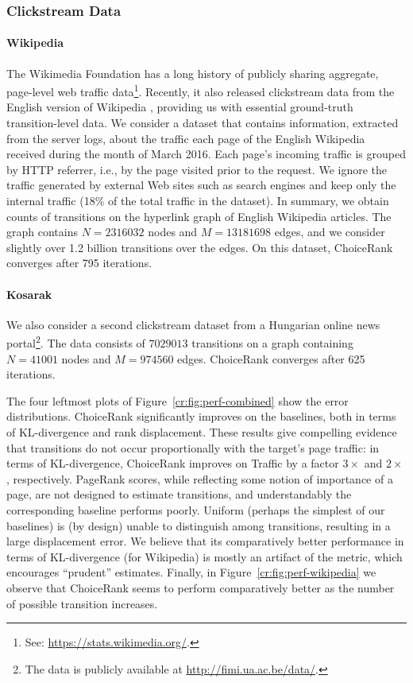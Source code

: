 \subsubsection{Clickstream Data}

\paragraph{Wikipedia}
The Wikimedia Foundation has a long history of publicly sharing aggregate, page-level web traffic data\footnote{See: \url{https://stats.wikimedia.org/}.}.
Recently, it also released clickstream data from the English version of Wikipedia \citep{wulczyn2016wikipedia}, providing us with essential ground-truth transition-level data.
We consider a dataset that contains information, extracted from the server logs, about the traffic each page of the English Wikipedia received during the month of March 2016.
Each page's incoming traffic is grouped by HTTP referrer, i.e., by the page visited prior to the request.
We ignore the traffic generated by external Web sites such as search engines and keep only the internal traffic (\num{18}\% of the total traffic in the dataset).
In summary, we obtain counts of transitions on the hyperlink graph of English Wikipedia articles.
The graph contains $N = \num{2316032}$ nodes and $M = \num{13181698}$ edges, and we consider slightly over \num{1.2} billion transitions over the edges.
On this dataset, ChoiceRank converges after \num{795} iterations.

\paragraph{Kosarak}
We also consider a second clickstream dataset from a Hungarian online news portal\footnote{The data is publicly available at \url{http://fimi.ua.ac.be/data/}.}.
The data consists of $\num{7029013}$ transitions on a graph containing $N = 41001$ nodes and $M = \num{974560}$ edges.
ChoiceRank converges after \num{625} iterations.

The four leftmost plots of Figure~\ref{cr:fig:perf-combined} show the error distributions.
ChoiceRank significantly improves on the baselines, both in terms of KL-divergence and rank displacement.
These results give compelling evidence that transitions do not occur proportionally with the target's page traffic: in terms of KL-divergence, ChoiceRank improves on Traffic by a factor $3\times$ and $2\times$, respectively.
PageRank scores, while reflecting some notion of importance of a page, are not designed to estimate transitions, and understandably the corresponding baseline performs poorly.
Uniform (perhaps the simplest of our baselines) is (by design) unable to distinguish among transitions, resulting in a large displacement error.
We believe that its comparatively better performance in terms of KL-divergence (for Wikipedia) is mostly an artifact of the metric, which encourages ``prudent'' estimates.
Finally, in Figure~\ref{cr:fig:perf-wikipedia} we observe that ChoiceRank seems to perform comparatively better as the number of possible transition increases.

